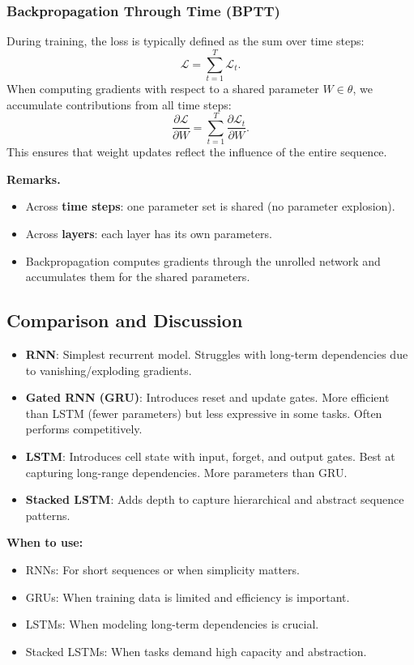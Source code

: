 \documentclass[11pt]{article}
\theoremstyle{remark}
\begin{document}
\subsubsection*{Backpropagation Through Time (BPTT)}
During training, the loss is typically defined as the sum over time steps:
\[
\mathcal{L} = \sum_{t=1}^{T} \mathcal{L}_t.
\]
When computing gradients with respect to a shared parameter $W \in \theta$, we accumulate contributions from all time steps:
\[
\frac{\partial \mathcal{L}}{\partial W} = \sum_{t=1}^{T} \frac{\partial \mathcal{L}_t}{\partial W}.
\]
This ensures that weight updates reflect the influence of the entire sequence.

\noindent\textbf{Remarks.}
\begin{itemize}
    \item Across \textbf{time steps}: one parameter set is shared (no parameter explosion).
    \item Across \textbf{layers}: each layer has its own parameters.
    \item Backpropagation computes gradients through the unrolled network and accumulates them for the shared parameters.
\end{itemize}

\subsection{Comparison and Discussion}
\begin{itemize}
    \item \textbf{RNN}: Simplest recurrent model. Struggles with long-term dependencies due to vanishing/exploding gradients.
    \item \textbf{Gated RNN (GRU)}: Introduces reset and update gates. More efficient than LSTM (fewer parameters) but less expressive in some tasks. Often performs competitively.
    \item \textbf{LSTM}: Introduces cell state with input, forget, and output gates. Best at capturing long-range dependencies. More parameters than GRU.
    \item \textbf{Stacked LSTM}: Adds depth to capture hierarchical and abstract sequence patterns.
\end{itemize}

\noindent \textbf{When to use:}
\begin{itemize}
    \item RNNs: For short sequences or when simplicity matters.
    \item GRUs: When training data is limited and efficiency is important.
    \item LSTMs: When modeling long-term dependencies is crucial.
    \item Stacked LSTMs: When tasks demand high capacity and abstraction.
\end{itemize}
\end{document}
